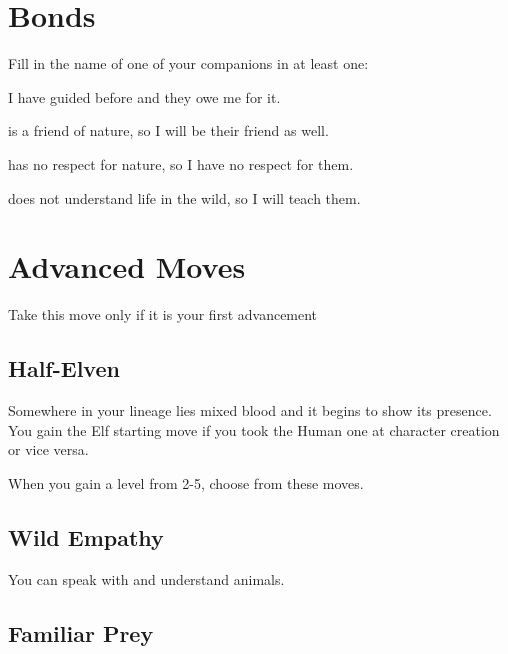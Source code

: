  
\section{Bonds}   
 



Fill in the name of one of your companions in at least one:

 

I have guided \thinrules[2] before and they owe me for it.

 

\thinrules[2] is a friend of nature, so I will be their friend as well.

 

\thinrules[2] has no respect for nature, so I have no respect for them.

 

\thinrules[2] does not understand life in the wild, so I will teach them.



 
\section{Advanced Moves}    
 


\startInstructionsAfterHeader
Take this move only if it is your first advancement
\stopInstructionsAfterHeader
 
\subsection{Half-Elven}   
 

Somewhere in your lineage lies mixed blood and it begins to show its presence. You gain the Elf starting move if you took the Human one at character creation or vice versa.

 
\startInstructions
When you gain a level from 2-5, choose from these moves.
\stopInstructions
 
\subsection{Wild Empathy}    
 

You can speak with and understand animals.

 
\subsection{Familiar Prey}    
 

